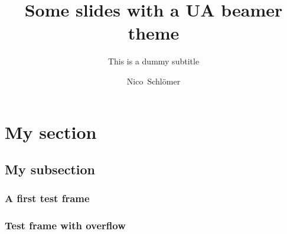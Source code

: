 \documentclass[pdflatex,compress]{beamer}
\title{Some slides with a UA beamer theme}
\subtitle{This is a dummy subtitle}
\author{Nico~Schl\"omer}
\begin{document}
\maketitle

\section{My section}
\subsection{My subsection}

\begin{frame}
\frametitle{A first test frame}
\lipsum[1]
\end{frame}

\begin{frame}
\frametitle{Test frame with overflow}
\lipsum%
\end{frame}


\end{document}
